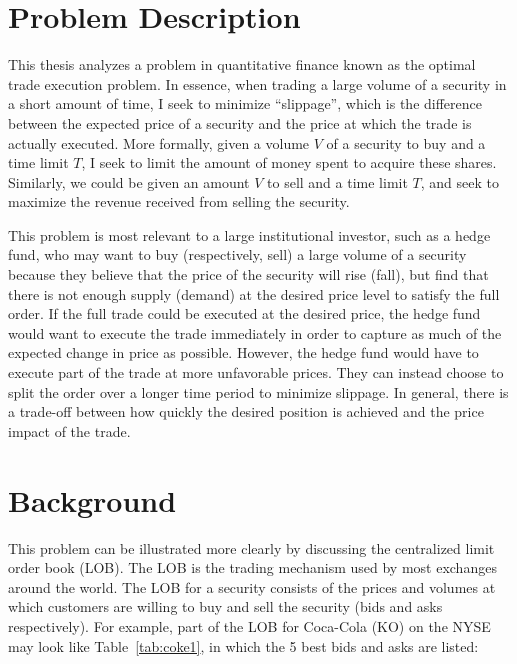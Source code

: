 \section{Problem Description} \label{ch:problemdescription}

This thesis analyzes a problem in quantitative finance known as the optimal trade execution problem. In essence, when trading a large volume of a security in a short amount of time, I seek to minimize “slippage”, which is the difference between the expected price of a security and the price at which the trade is actually executed. More formally, given a volume $V$ of a security to buy and a time limit $T$, I seek to limit the amount of money spent to acquire these shares. Similarly, we could be given an amount $V$ to sell and a time limit $T$, and seek to maximize the revenue received from selling the security. 

This problem is most relevant to a large institutional investor, such as a hedge fund, who may want to buy (respectively, sell) a large volume of a security because they believe that the price of the security will rise (fall), but find that there is not enough supply (demand) at the desired price level to satisfy the full order. If the full trade could be executed at the desired price, the hedge fund would want to execute the trade immediately in order to capture as much of the expected change in price as possible. However, the hedge fund would have to execute part of the trade at more unfavorable prices. They can instead choose to split the order over a longer time period to minimize slippage. In general, there is a trade-off between how quickly the desired position is achieved and the price impact of the trade.


\section{Background} \label{ch:background}
This problem can be illustrated more clearly by discussing the centralized limit order book (LOB). The LOB is the trading mechanism used by most exchanges around the world. The LOB for a security consists of the prices and volumes at which customers are willing to buy and sell the security (bids and asks respectively). For example, part of the LOB for Coca-Cola (KO) on the NYSE may look like Table~\ref{tab:coke1}, in which the 5 best bids and asks are listed:

